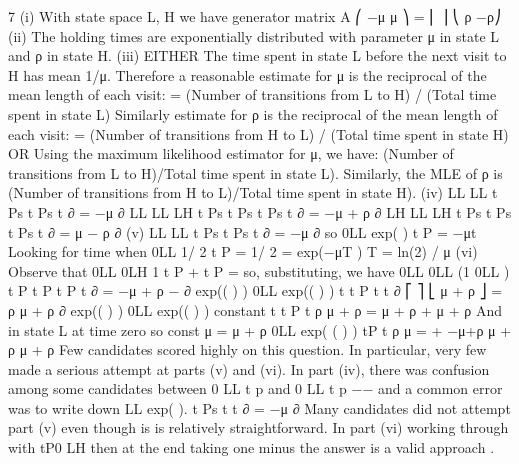 \documentclass[a4paper,12pt]{article}
\begin{document}
7
(i) With state space {L, H} we have generator matrix
A
⎛ −μ μ ⎞
= ⎜ ⎟ ⎝ ρ −ρ⎠
(ii) The holding times are exponentially distributed with parameter μ in state L and ρ in
state H.
(iii) EITHER
The time spent in state L before the next visit to H has mean 1/μ.
Therefore a reasonable estimate for μ is the reciprocal of the mean length of each
visit:
= (Number of transitions from L to H) / (Total time spent in state L)
Similarly estimate for ρ is the reciprocal of the mean length of each visit:
= (Number of transitions from H to L) / (Total time spent in state H)
OR
Using the maximum likelihood estimator for μ, we have:
(Number of transitions from L to H)/Total time spent in state L).
Similarly, the MLE of ρ is
(Number of transitions from H to L)/Total time spent in state H).
(iv) LL LL
t Ps t Ps
t
∂
= −μ
∂
LL LL LH
t Ps t Ps t Ps
t
∂
= −μ + ρ
∂
LH LL LH
t Ps t Ps t Ps
t
∂
= μ − ρ
∂
(v) LL LL
t Ps t Ps
t
∂
= −μ
∂
so 0LL exp( )
t P = −μt
Looking for time when 0LL 1/ 2
t P =
1/ 2 = exp(−μT )
T = ln(2) / μ
(vi) Observe that 0LL 0LH 1
t P + t P =
so, substituting, we have
0LL 0LL (1 0LL )
t P t P t P
t
∂
= −μ + ρ −
∂
exp(( ) ) 0LL exp(( ) )
t t P t
t
∂ ⎡ ⎤ ⎣ μ + ρ ⎦ = ρ μ + ρ ∂
exp(( ) ) 0LL exp(( ) ) constant
t t P t
ρ
μ + ρ = μ + ρ +
μ + ρ
And in state L at time zero so const
μ
=
μ + ρ
0LL exp( ( ) )
tP t
ρ μ
= + −μ+ρ
μ + ρ μ + ρ
Few candidates scored highly on this question. In particular, very few made a serious
attempt at parts (v) and (vi). In part (iv), there was confusion among some candidates
between 0
LL
t p and 0
LL
t p
−−
and
a common error was to write down LL exp( ).
t Ps t
t
∂
= −μ
∂
Many candidates did not attempt part (v) even though is is relatively straightforward.
In part (vi) working through with tP0
LH then at the end taking one minus the answer is a valid
approach .
\end{document}
